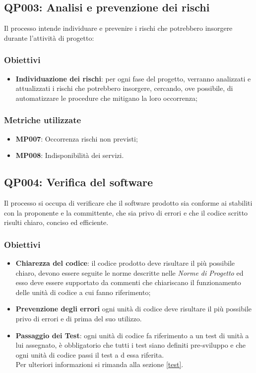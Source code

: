 \subsection{QP003: Analisi e prevenzione dei rischi}
Il processo intende individuare e prevenire i rischi che potrebbero insorgere durante l'attività di progetto:

\subsubsection{Obiettivi}
\begin{itemize}
	\item \textbf{Individuazione dei rischi}: per ogni fase del progetto, verranno analizzati e attualizzati i rischi che potrebbero insorgere, cercando, ove possibile, di automatizzare le procedure che mitigano la loro occorrenza;
\end{itemize}

\subsubsection{Metriche utilizzate}
\begin{itemize}	
	\item \textbf{MP007}: Occorrenza rischi non previsti;
	\item \textbf{MP008}: Indisponibilità dei servizi.
\end{itemize}
\subsection{QP004: Verifica del software}
Il processo si occupa di verificare che il software prodotto sia conforme ai  stabiliti con la proponente e la committente, che sia privo di errori e che il codice scritto risulti chiaro, conciso ed efficiente.
\subsubsection{Obiettivi}
\begin{itemize}
	\item \textbf{Chiarezza del codice}: il codice prodotto deve risultare il più possibile chiaro, devono essere seguite le norme descritte nelle \textit{Norme di Progetto} ed esso deve essere supportato da commenti che chiariscano il funzionamento delle unità di codice a cui fanno riferimento;
	\item \textbf{Prevenzione degli errori} ogni unità di codice deve risultare il più possibile privo di errori e di  prima del suo utilizzo.
	\item \textbf{Passaggio dei Test}: ogni unità di codice fa riferimento a un test di unità a lui assegnato, è obbligatorio che tutti i test siano definiti pre-sviluppo e che ogni unità di codice passi il test a d essa riferita.\\
	Per ulteriori informazioni si rimanda alla sezione \ref{test}.
\end{itemize}
